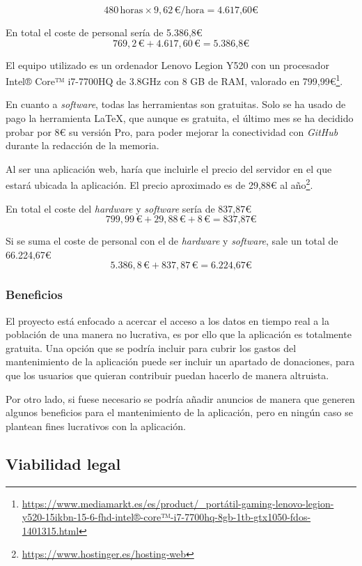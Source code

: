 $$480 \, \text{horas} \times 9,62 \, \text{€/hora} = \text{4.617,60€}$$

En total el coste de personal sería de 5.386,8€
$$769,2 \, \text{€} + 4.617,60 \, \text{€} = \text{5.386,8€}$$

El equipo utilizado es un ordenador Lenovo Legion Y520 con un procesador Intel® Core™ i7-7700HQ de 3.8GHz con 8 GB de RAM, valorado en 799,99€\footnote{\url{https://www.mediamarkt.es/es/product/_portátil-gaming-lenovo-legion-y520-15ikbn-15-6-fhd-intel®-core™-i7-7700hq-8gb-1tb-gtx1050-fdos-1401315.html}}.

En cuanto a \textit{software}, todas las herramientas son gratuitas. Solo se ha usado de pago la herramienta \LaTeX{}, que aunque es gratuita, el último mes se ha decidido probar por 8€ su versión Pro, para poder mejorar la conectividad con \textit{GitHub} durante la redacción de la memoria.

Al ser una aplicación web, haría que incluirle el precio del servidor en el que estará ubicada la aplicación. El precio aproximado es de 29,88€ al año\footnote{\url{https://www.hostinger.es/hosting-web}}.

En total el coste del \textit{hardware} y \textit{software} sería de 837,87€
$$799,99 \, \text{€} + 29,88 \, \text{€} + 8 \, \text{€} = \text{837,87€}$$

Si se suma el coste de personal con el de \textit{hardware} y \textit{software}, sale un total de 66.224,67€
$$5.386,8 \, \text{€} + 837,87 \, \text{€} = \text{6.224,67€}$$

\subsubsection{Beneficios}

El proyecto está enfocado a acercar el acceso a los datos en tiempo real a la población de una manera no lucrativa, es por ello que la aplicación es totalmente gratuita.
Una opción que se podría incluir para cubrir los gastos del mantenimiento de la aplicación puede ser incluir un apartado de donaciones, para que los usuarios que quieran contribuir puedan hacerlo de manera altruista.

Por otro lado, si fuese necesario se podría añadir anuncios de manera que generen algunos beneficios para el mantenimiento de la aplicación, pero en ningún caso se plantean fines lucrativos con la aplicación.

\subsection{Viabilidad legal}

